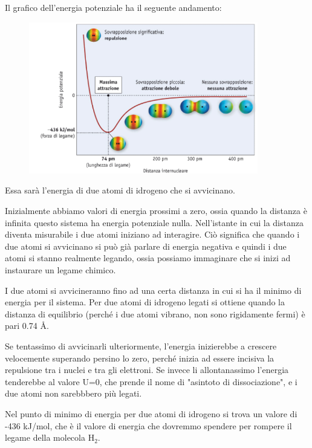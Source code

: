 Il grafico dell'energia potenziale ha il seguente andamento:
\begin{figure}[htp]
    \centering
    \includegraphics[width=10cm]{immagini/energia-potenziale.png}
\end{figure}

Essa sarà l'energia di due atomi di idrogeno che si avvicinano.

Inizialmente abbiamo valori di energia prossimi a zero, ossia quando la distanza è infinita questo sistema ha energia potenziale nulla. Nell'istante in cui la distanza diventa misurabile i due atomi iniziano ad interagire. Ciò significa che quando i due atomi si avvicinano si può già parlare di energia negativa e quindi i due atomi si stanno realmente legando, ossia possiamo immaginare che si inizi ad instaurare un legame chimico.

I due atomi si avvicineranno fino ad una certa distanza in cui si ha il minimo di energia per il sistema. Per due atomi di idrogeno legati si ottiene quando la distanza di equilibrio (perché i due atomi vibrano, non sono rigidamente fermi) è pari 0.74 Å.

Se tentassimo di avvicinarli ulteriormente, l'energia inizierebbe a crescere velocemente superando persino lo zero, perché inizia ad essere incisiva la repulsione tra i nuclei e tra gli elettroni. Se invece li allontanassimo l'energia tenderebbe al valore U=0, che prende il nome di "asintoto di dissociazione", e i due atomi non sarebbbero più legati.

Nel punto di minimo di energia per due atomi di idrogeno si trova un valore di -436 kJ/mol, che è il valore di energia che dovremmo spendere per rompere il legame della molecola H$_2$.

